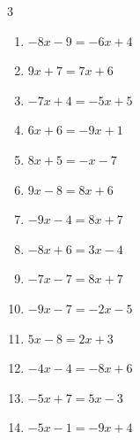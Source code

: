 \begin{multicols}{3}
\begin{enumerate}
  \item $-8x-9=-6x+4$


  \item $9x+7=7x+6$


  \item $-7x+4=-5x+5$


\columnbreak %

  \item $6x+6=-9x+1$


  \item $8x+5=-x-7$


  \item $9x-8=8x+6$

        \phantom{$\displaystyle x=14$}

  \item $-9x-4=8x+7$


  \item $-8x+6=3x-4$


  \item $-7x-7=8x+7$


  \item $-9x-7=-2x-5$


  \item $5x-8=2x+3$


  \item $-4x-4=-8x+6$


  \item $-5x+7=5x-3$

        \phantom{$\displaystyle x=1$}

  \item $-5x-1=-9x+4$


\end{enumerate}
\end{multicols}
